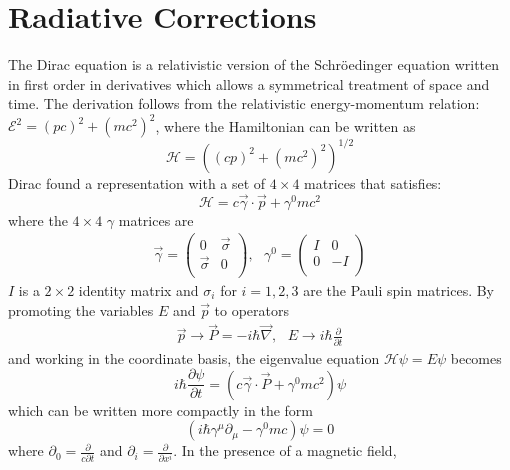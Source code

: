 \documentclass{outhesis}
\begin{document}
  \chapter{Radiative Corrections}
 \label{app:schwinger}
The Dirac equation is a relativistic version of the Schr\"{o}edinger equation written in first order in derivatives which allows a symmetrical treatment of space and time. The derivation follows from the relativistic energy-momentum relation: $\mathcal{E}^2 = (pc)^2+(mc^2)^2$, where the Hamiltonian can be written as
\[
\mathcal{H} = \left( (cp)^2 + (mc^2)^2 \right)^{1/2}
\]
Dirac found a representation with a set of $4\times4$ matrices that satisfies:
\begin{equation}
\mathcal{H} = c \overrightarrow{\gamma}\cdot \overrightarrow{p} + \gamma^0mc^2
\end{equation}
where the $4\times4 \,\,\gamma$ matrices are
\begin{equation}
\begin{split}
\overrightarrow{\gamma} =
\begin{pmatrix}
0 & \overrightarrow{\sigma} \\
\overrightarrow{\sigma} & 0 \\
\end{pmatrix} 
, \,\,\,\,
\gamma^0 =
\begin{pmatrix}
I & 0 \\
0 & -I \\
\end{pmatrix} 
\end{split}
\end{equation}
$I$ is a $2\times2$ identity matrix and $\sigma_i$ for $i=1,2,3$ are the Pauli spin matrices.
By promoting the variables $E$ and $\overrightarrow{p}$ to operators 
\[
\begin{split}
\overrightarrow{p} \to \overrightarrow{P}=-i\hbar\overrightarrow{\nabla},
\,\,\,\,
E \to i\hbar \frac{\partial }{\partial t}
\end{split}
\]
and working in the coordinate basis, the eigenvalue equation $\mathcal{H}  \psi = E \psi$ becomes
\begin{equation}
i\hbar \frac{\partial \psi}{\partial t} = \left(  c \overrightarrow{\gamma}\cdot \overrightarrow{P} + \gamma^0mc^2  \right) \psi
\end{equation}
which can be written more compactly in the form
\begin{equation}
\left(i\hbar \gamma^{\mu}\partial_{\mu}-\gamma^0mc\right) \psi = 0
\end{equation}
where $\partial_0 =  \frac{\partial}{c\partial t}$ and $\partial_i =  \frac{\partial}{\partial x^i}$.
In the presence of a magnetic field, 
\end{document}
